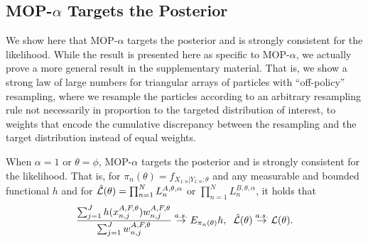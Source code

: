 \documentclass[9pt,twocolumn,twoside]{pnas-new}
\begin{document}
\subsection{MOP-$\alpha$ Targets the Posterior}


We show here that MOP-$\alpha$ targets the posterior and is strongly consistent for the likelihood. While the result is presented here as specific to MOP-$\alpha$, we actually prove a more general result in the supplementary material. That is, we show a strong law of large numbers for triangular arrays of particles with ``off-policy'' resampling, where we resample the particles according to an arbitrary resampling rule not necessarily in proportion to the targeted distribution of interest, to weights that encode the cumulative discrepancy between the resampling and the target distribution instead of equal weights.


\begin{thm}
    \label{thm:mop-targeting}
    When $\alpha=1$ or $\theta=\phi$, MOP-$\alpha$ targets the posterior and is strongly consistent for the likelihood. That is, for $\pi_n(\theta)=f_{X_{1:n}|Y_{1:n} ; \theta}$ and any measurable and bounded functional $h$ and for $\hat{\mathcal{L}}(\theta) = \prod_{n=1}^N L_n^{A,\theta,\alpha}$ or $\prod_{n=1}^N L_n^{B,\theta,\alpha}$, it holds that
    \vspace*{-2.5mm}
    \begin{equation}
        \frac{\sum_{j=1}^J h(x_{n,j}^{A,F, \theta}) w_{n,j}^{A,F,\theta}}{\sum_{j=1}^J w_{n,j}^{A,F,\theta}} \stackrel{a.s.}{\to} E_{\pi_n(\theta)} h, \;\; \hat\lik(\theta)  \stackrel{a.s.}{\to} \lik(\theta).
    \vspace*{-2.5mm}
    \end{equation}
\end{thm}

\end{document}
